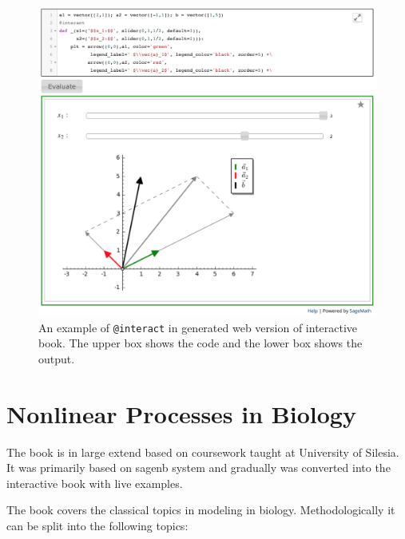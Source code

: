 \documentclass{deliverablereport}
\begin{document}
\begin{figure}
\centerline{\includegraphics[width=.7\textwidth]{interact_in_sphinx.png}}
\caption{\label{fig:interact_sphinx} An example of \texttt{@interact} in
  \Sphinx generated web version of interactive book. The upper box
  shows the code and the lower box shows the output.}
\end{figure}



\section{ Nonlinear Processes in Biology }


The book is in large extend based on coursework taught at University
of Silesia. It was primarily based on sagenb system and gradually was
converted into the interactive book with live examples.


The book covers the classical topics in modeling in
biology. Methodologically it can be split into the following topics:
\end{document}

